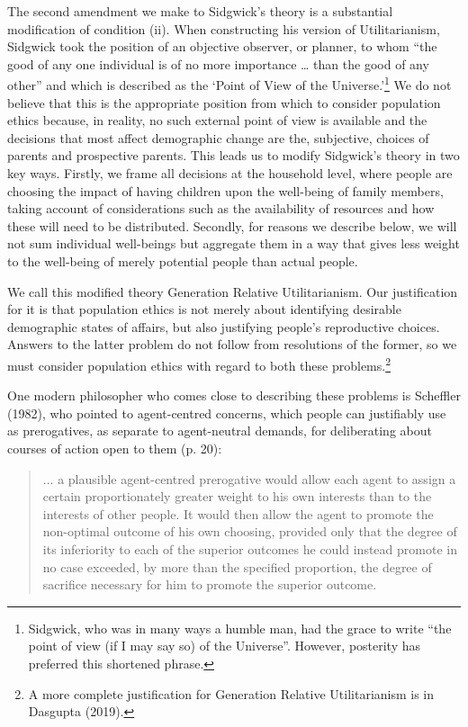 \documentclass[man,11pt,a4paper,floatsintext]{apa7}
\begin{document}
The second amendment we make to Sidgwick's theory is a substantial modification of condition (ii). When constructing his version of Utilitarianism, Sidgwick took the position of an objective observer, or planner, to whom ``the good of any one individual is of no more importance \ldots{} than the good of any other'' and which is described as the `Point of View of the Universe.'\footnote{Sidgwick, who was in many ways a humble man, had the grace to write ``the point of view (if I may say so) of the Universe''. However, posterity has preferred this shortened phrase.} We do not believe that this is the appropriate position from which to consider population ethics because, in reality, no such external point of view is available and the decisions that most affect demographic change are the, subjective, choices of parents and prospective parents. This leads us to modify Sidgwick's theory in two key ways. Firstly, we frame all decisions at the household level, where people are choosing the impact of having children upon the well-being of family members, taking account of considerations such as the availability of resources and how these will need to be distributed. Secondly, for reasons we describe below, we will not sum individual well-beings but aggregate them in a way that gives less weight to the well-being of merely potential people than actual people.

We call this modified theory Generation Relative Utilitarianism. Our justification for it is that population ethics is not merely about identifying desirable demographic states of affairs, but also justifying people's reproductive choices. Answers to the latter problem do not follow from resolutions of the former, so we must consider population ethics with regard to both these problems.\footnote{A more complete justification for Generation Relative Utilitarianism is in Dasgupta (2019).}

One modern philosopher who comes close to describing these problems is Scheffler (1982), who pointed to agent-centred concerns, which people can justifiably use as prerogatives, as separate to agent-neutral demands, for deliberating about courses of action open to them (p. 20):

\begin{quote}
... a plausible agent-centred prerogative would allow each agent to assign a certain proportionately greater weight to his own interests than to the interests of other people. It would then allow the agent to promote the non-optimal outcome of his own choosing, provided only that the degree of its inferiority to each of the superior outcomes he could instead promote in no case exceeded, by more than the specified proportion, the degree of sacrifice necessary for him to promote the superior outcome.
\end{quote}
\end{document}
